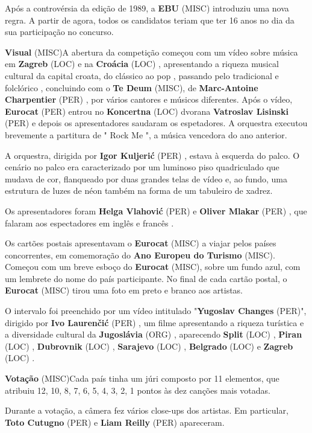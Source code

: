 \documentclass[12pt,a4paper]{article}
\begin{document}
Após a controvérsia da edição de 1989, a \textbf{EBU} (MISC) introduziu uma nova regra. A partir de agora, todos os candidatos teriam que ter 16 anos no dia da sua participação no concurso.



\textbf{Visual} (MISC)A abertura da competição começou com um vídeo sobre música em \textbf{Zagreb} (LOC) e na \textbf{Croácia} (LOC) , apresentando a riqueza musical cultural da capital croata, do clássico ao pop , passando pelo tradicional e folclórico , concluindo com o \textbf{Te Deum} (MISC), de \textbf{Marc-Antoine Charpentier} (PER) , por vários cantores e músicos diferentes. Após o vídeo, \textbf{Eurocat} (PER) entrou no \textbf{Koncertna} (LOC) dvorana \textbf{Vatroslav Lisinski} (PER) e depois os apresentadores saudaram os espetadores. A orquestra executou brevemente a partitura de " Rock Me ", a música vencedora do ano anterior.

A orquestra, dirigida por \textbf{Igor Kuljerić} (PER) , estava à esquerda do palco. O cenário no palco era caracterizado por um luminoso piso quadriculado que mudava de cor, flanqueado por duas grandes telas de vídeo e, ao fundo, uma estrutura de luzes de néon também na forma de um tabuleiro de xadrez.

Os apresentadores foram \textbf{Helga Vlahović} (PER) e \textbf{Oliver Mlakar} (PER) , que falaram aos espectadores em inglês e francês .

Os cartões postais apresentavam o \textbf{Eurocat} (MISC) a viajar pelos países concorrentes, em comemoração do \textbf{Ano Europeu do Turismo} (MISC). Começou com um breve esboço do \textbf{Eurocat} (MISC), sobre um fundo azul, com um lembrete do nome do país participante. No final de cada cartão postal, o \textbf{Eurocat} (MISC) tirou uma foto em preto e branco aos artistas.

O intervalo foi preenchido por um vídeo intitulado "\textbf{Yugoslav Changes} (PER)", dirigido por \textbf{Ivo Laurenčić} (PER) , um filme apresentando a riqueza turística e a diversidade cultural da \textbf{Jugoslávia} (ORG) , aparecendo \textbf{Split} (LOC) , \textbf{Piran} (LOC) , \textbf{Dubrovnik} (LOC) , \textbf{Sarajevo} (LOC) , \textbf{Belgrado} (LOC) e \textbf{Zagreb} (LOC) .



\textbf{Votação} (MISC)Cada país tinha um júri composto por 11 elementos, que atribuiu 12, 10, 8, 7, 6, 5, 4, 3, 2, 1 pontos às dez canções mais votadas.

Durante a votação, a câmera fez vários close-ups dos artistas. Em particular, \textbf{Toto Cutugno} (PER) e \textbf{Liam Reilly} (PER) apareceram.
\end{document}
